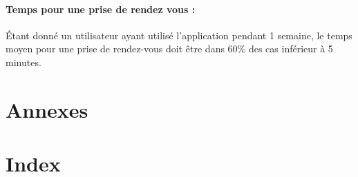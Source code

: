 \documentclass{article}
\begin{document}
\paragraph{Temps pour une prise de rendez vous :} 
Étant donné un utilisateur ayant utilisé l'application pendant 1
semaine, le temps moyen pour une prise de rendez-vous doit être dans
60\% des cas inférieur à 5 minutes.

  

\section{Annexes}


\section{Index}
\end{document}
